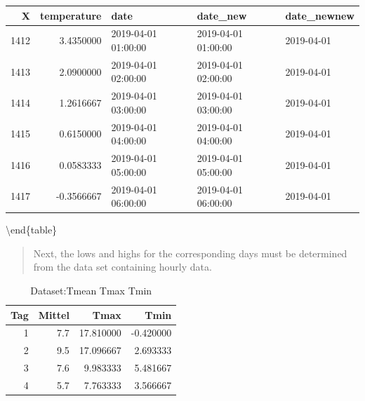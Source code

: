 \documentclass[
]{book}
\newenvironment{Shaded}{\begin{snugshade}}{\end{snugshade}}
\newcommand{\DataTypeTok}[1]{\textcolor[rgb]{0.13,0.29,0.53}{#1}}
\newcommand{\DecValTok}[1]{\textcolor[rgb]{0.00,0.00,0.81}{#1}}
\newcommand{\KeywordTok}[1]{\textcolor[rgb]{0.13,0.29,0.53}{\textbf{#1}}}
\newcommand{\NormalTok}[1]{#1}
\newcommand{\OperatorTok}[1]{\textcolor[rgb]{0.81,0.36,0.00}{\textbf{#1}}}
\newcommand{\OtherTok}[1]{\textcolor[rgb]{0.56,0.35,0.01}{#1}}
\newcommand{\StringTok}[1]{\textcolor[rgb]{0.31,0.60,0.02}{#1}}
\begin{document}
\begin{tabular}[t]{r|r|l|l|l}
\hline
X & temperature & date & date\_new & date\_newnew\\
\hline
1412 & 3.4350000 & 2019-04-01 01:00:00 & 2019-04-01 01:00:00 & 2019-04-01\\
\hline
1413 & 2.0900000 & 2019-04-01 02:00:00 & 2019-04-01 02:00:00 & 2019-04-01\\
\hline
1414 & 1.2616667 & 2019-04-01 03:00:00 & 2019-04-01 03:00:00 & 2019-04-01\\
\hline
1415 & 0.6150000 & 2019-04-01 04:00:00 & 2019-04-01 04:00:00 & 2019-04-01\\
\hline
1416 & 0.0583333 & 2019-04-01 05:00:00 & 2019-04-01 05:00:00 & 2019-04-01\\
\hline
1417 & -0.3566667 & 2019-04-01 06:00:00 & 2019-04-01 06:00:00 & 2019-04-01\\
\hline
\end{tabular}

\textbackslash end\{table\}

\begin{quote}
Next, the lows and highs for the corresponding days must be determined from the data set containing hourly data.
\end{quote}

\begin{Shaded}
\end{Shaded}

\begin{table}

\caption{\label{tab:unnamed-chunk-21}Dataset:Tmean Tmax Tmin}
\fontsize{10}{12}\selectfont
\begin{tabular}[t]{r|r|r|r}
\hline
Tag & Mittel & Tmax & Tmin\\
\hline
1 & 7.7 & 17.810000 & -0.420000\\
\hline
2 & 9.5 & 17.096667 & 2.693333\\
\hline
3 & 7.6 & 9.983333 & 5.481667\\
\hline
4 & 5.7 & 7.763333 & 3.566667\\
\hline
\end{tabular}
\end{table}
\end{document}
